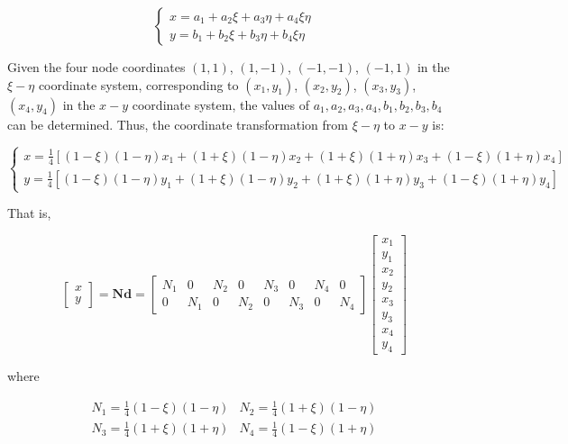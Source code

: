 \documentclass{article}
\begin{document}
\[
  \begin{cases}
    x = a_1 + a_2 \xi + a_3 \eta + a_4 \xi \eta \\
    y = b_1 + b_2 \xi + b_3 \eta + b_4 \xi \eta
  \end{cases}
\]

Given the four node coordinates \((1, 1)\), \((1, -1)\), \((-1, -1)\), \((-1, 1)\) in the \( \xi-\eta \) coordinate system, corresponding to \((x_1, y_1)\), \((x_2, y_2)\), \((x_3, y_3)\), \((x_4, y_4)\) in the \( x-y \) coordinate system, the values of \( a_1, a_2, a_3, a_4, b_1, b_2, b_3, b_4 \) can be determined.
Thus, the coordinate transformation from \( \xi-\eta \) to \( x-y \) is:

\[
  \begin{cases}
    x = \frac{1}{4} \left[(1 - \xi)(1 - \eta)x_1 + (1 + \xi)(1 - \eta)x_2 + (1 + \xi)(1 + \eta)x_3 + (1 - \xi)(1 + \eta)x_4\right] \\
    y = \frac{1}{4} \left[(1 - \xi)(1 - \eta)y_1 + (1 + \xi)(1 - \eta)y_2 + (1 + \xi)(1 + \eta)y_3 + (1 - \xi)(1 + \eta)y_4\right]
  \end{cases}
\]

That is,

\[
  \begin{bmatrix}
    x \\
    y
  \end{bmatrix} = \mathbf{N} \mathbf{d} =
  \begin{bmatrix}
    N_1 & 0   & N_2 & 0   & N_3 & 0   & N_4 & 0   \\
    0   & N_1 & 0   & N_2 & 0   & N_3 & 0   & N_4
  \end{bmatrix}
  \begin{bmatrix}
    x_1 \\
    y_1 \\
    x_2 \\
    y_2 \\
    x_3 \\
    y_3 \\
    x_4 \\
    y_4
  \end{bmatrix}
\]

where

\[
  \begin{matrix}
    N_1 = \frac{1}{4} (1 - \xi)(1 -\eta)  & N_2 = \frac{1}{4} (1 + \xi)(1 - \eta) \\
    N_3 = \frac{1}{4} (1 + \xi)(1 + \eta) & N_4 = \frac{1}{4} (1 - \xi)(1 + \eta)
  \end{matrix}
\]
\end{document}
